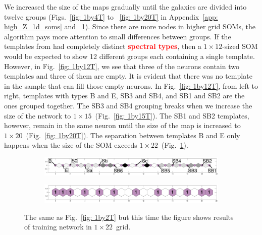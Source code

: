             We increased the size of the maps gradually until the galaxies are divided into twelve groups (Figs.~\ref{fig: 1by4T} to ~\ref{fig: 1by20T} in Appendix~\ref{app: high_Z_1d_soms} and ~\ref{fig: 1by22T}).
            Since there are more nodes in higher grid SOMs, the algorithm 
            pays more attention to small differences between groups.
            If the templates from  had completely distinct \textbf{\textcolor{red}{spectral types}}, then a $1\times12$-sized SOM would be expected to show 12 different groups each containing a single template.
            However, in Fig.~\ref{fig: 1by12T}, we see that three of the neurons contain two templates and three of them are empty.
            It is evident that there was no template in the  sample that can fill those empty neurons.
            In Fig.~\ref{fig: 1by12T}, from left to right, templates with types B and E, SB3 and SB4, and SB1 and SB2 are the ones grouped together. 
            The SB3 and SB4 grouping breaks when we increase the size of the network to $1\times15$~(Fig.~\ref{fig: 1by15T}).
            The SB1 and SB2 templates, however, remain in the same neuron until the size of the map is increased to $1\times20$~(Fig.~\ref{fig: 1by20T}).
            The separation between templates B and E only happens when the size of the SOM exceeds $1\times22$~(Fig.~\ref{fig: 1by22T}).
        \begin{figure}
            \begin{subfigure}[b]{\textwidth}
                \centering
                \includegraphics[width=\textwidth]{images0.01/1d/dist_1_by_22.png}
            \end{subfigure}
            \hfill
            \begin{subfigure}[b]{\textwidth}
                \includegraphics[width=\textwidth]{images0.01/1d/hit_t_1_by_22.png}
            \end{subfigure}
            \caption[Results of training network in $1\times22$~grid]{The same as Fig.~\ref{fig: 1by2T} but this time the figure shows results of training network in $1\times22$~grid.}
            \label{fig: 1by22T}
        \end{figure} 
    
